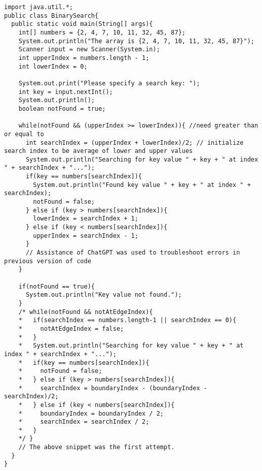 \documentclass[10pt]{mypackage}
\begin{document}
  \begin{lstlisting}[style=javastyle,title= Binary Search]
import java.util.*;
public class BinarySearch{
  public static void main(String[] args){
    int[] numbers = {2, 4, 7, 10, 11, 32, 45, 87};
    System.out.println("The array is {2, 4, 7, 10, 11, 32, 45, 87}");
    Scanner input = new Scanner(System.in);
    int upperIndex = numbers.length - 1;
    int lowerIndex = 0;

    System.out.print("Please specify a search key: ");
    int key = input.nextInt();
    System.out.println();
    boolean notFound = true;

    while(notFound && (upperIndex >= lowerIndex)){ //need greater than or equal to
      int searchIndex = (upperIndex + lowerIndex)/2; // initialize search index to be average of lower and upper values
      System.out.println("Searching for key value " + key + " at index " + searchIndex + "...");
      if(key == numbers[searchIndex]){
        System.out.println("Found key value " + key + " at index " + searchIndex);
        notFound = false;
      } else if (key > numbers[searchIndex]){
        lowerIndex = searchIndex + 1;
      } else if (key < numbers[searchIndex]){
        upperIndex = searchIndex - 1;
      }
      // Assistance of ChatGPT was used to troubleshoot errors in previous version of code
    }
    
    if(notFound == true){
      System.out.println("Key value not found.");
    }
    /* while(notFound && notAtEdgeIndex){
    *   if(searchIndex == numbers.length-1 || searchIndex == 0){
    *     notAtEdgeIndex = false;
    *   }
    *   System.out.println("Searching for key value " + key + " at index " + searchIndex + "...");
    *   if(key == numbers[searchIndex]){
    *     notFound = false;
    *   } else if (key > numbers[searchIndex]){
    *     searchIndex = boundaryIndex - (boundaryIndex - searchIndex)/2;
    *   } else if (key < numbers[searchIndex]){
    *     boundaryIndex = boundaryIndex / 2;
    *     searchIndex = searchIndex / 2;
    *   }
    */ }
    // The above snippet was the first attempt.
  }
}
  \end{lstlisting}
  
\end{document}
